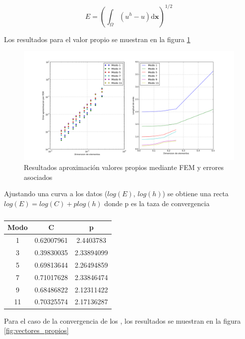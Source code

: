 $$E = \left(\int_{\Omega} (u^h - u) \mathrm{d}\boldsymbol{x} \right)^{1/2}$$

Los resultados para el valor propio se muestran en la figura \ref{fig:velores_propios}

\begin{figure}
  \centering
  \includegraphics[width=17cm]{figuras/valores_propiosFEM.png}
  \caption{ Resultados aproximaci\'on valores propios mediante FEM y errores asociados}  
  \label{fig:velores_propios}
\end{figure}

Ajustando una curva a los datos ($log(E)$, $log(h)$) se obtiene una recta $log(E) = log(C) + p log(h)$ donde p es la taza de convergencia


\begin{table}[h]
\centering
\begin{tabular}{|c|c|c|}
\hline 
Modo & C & p \\ 
\hline 
1 & 0.62007961 & 2.4403783 \\
\hline 
3 & 0.39830035 & 2.33894099 \\ 
\hline 
5 & 0.69813644 & 2.26494859 \\  
\hline 
7 & 0.71017628 & 2.33846474 \\ 
\hline 
9 & 0.68486822 & 2.12311422 \\  
\hline 
11 &  0.70325574 & 2.17136287 \\
\hline 
\end{tabular} 
\caption{}
\end{table}

Para el caso de la convergencia de los , los resultados se muestran en la figura \ref{fig:vectores_propios}

